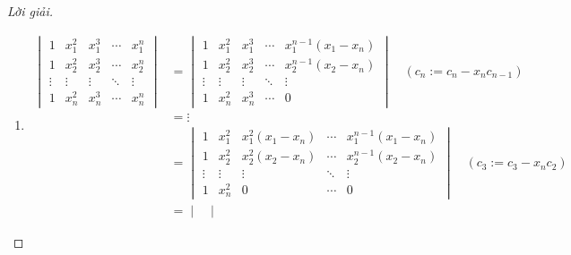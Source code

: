 \begin{proof}[Lời giải]
    \begin{enumerate}[label = (\alph*)]
        \item
              \begin{align*}
                  \begin{vmatrix}
                      1      & x_{1}^{2} & x_{1}^{3} & \cdots & x_{1}^{n} \\
                      1      & x_{2}^{2} & x_{2}^{3} & \cdots & x_{2}^{n} \\
                      \vdots & \vdots    & \vdots    & \ddots & \vdots    \\
                      1      & x_{n}^{2} & x_{n}^{3} & \cdots & x_{n}^{n}
                  \end{vmatrix}
                   & =
                  \begin{vmatrix}
                      1      & x_{1}^{2} & x_{1}^{3} & \cdots & x_{1}^{n-1}(x_{1} - x_{n}) \\
                      1      & x_{2}^{2} & x_{2}^{3} & \cdots & x_{2}^{n-1}(x_{2} - x_{n}) \\
                      \vdots & \vdots    & \vdots    & \ddots & \vdots                     \\
                      1      & x_{n}^{2} & x_{n}^{3} & \cdots & 0
                  \end{vmatrix}\quad(c_{n}:= c_{n} - x_{n}c_{n-1})                                     \\
                   & = \vdots                                                                                              \\
                   & =
                  \begin{vmatrix}
                      1      & x_{1}^{2} & x_{1}^{2}(x_{1} - x_{n}) & \cdots & x_{1}^{n-1}(x_{1} - x_{n}) \\
                      1      & x_{2}^{2} & x_{2}^{2}(x_{2} - x_{n}) & \cdots & x_{2}^{n-1}(x_{2} - x_{n}) \\
                      \vdots & \vdots    & \vdots                   & \ddots & \vdots                     \\
                      1      & x_{n}^{2} & 0                        & \cdots & 0
                  \end{vmatrix}\quad(c_{3}:=c_{3} - x_{n}c_{2})                      \\
                   & =
                  \begin{vmatrix}

\end{vmatrix}
\end{align*}
\end{enumerate}
\end{proof}
